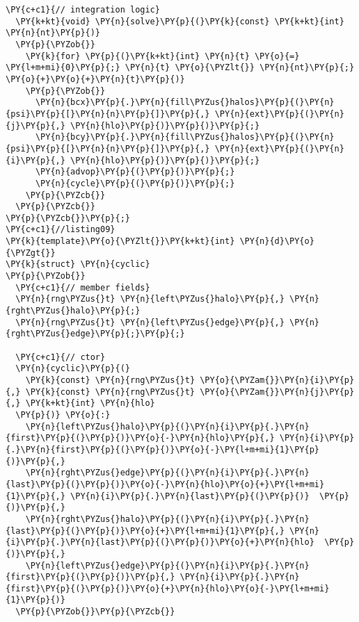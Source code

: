 \begin{Verbatim}[commandchars=\\\{\}]
  \PY{c+c1}{// integration logic}
  \PY{k+kt}{void} \PY{n}{solve}\PY{p}{(}\PY{k}{const} \PY{k+kt}{int} \PY{n}{nt}\PY{p}{)} 
  \PY{p}{\PYZob{}}
    \PY{k}{for} \PY{p}{(}\PY{k+kt}{int} \PY{n}{t} \PY{o}{=} \PY{l+m+mi}{0}\PY{p}{;} \PY{n}{t} \PY{o}{\PYZlt{}} \PY{n}{nt}\PY{p}{;} \PY{o}{+}\PY{o}{+}\PY{n}{t}\PY{p}{)} 
    \PY{p}{\PYZob{}}
      \PY{n}{bcx}\PY{p}{.}\PY{n}{fill\PYZus{}halos}\PY{p}{(}\PY{n}{psi}\PY{p}{[}\PY{n}{n}\PY{p}{]}\PY{p}{,} \PY{n}{ext}\PY{p}{(}\PY{n}{j}\PY{p}{,} \PY{n}{hlo}\PY{p}{)}\PY{p}{)}\PY{p}{;}
      \PY{n}{bcy}\PY{p}{.}\PY{n}{fill\PYZus{}halos}\PY{p}{(}\PY{n}{psi}\PY{p}{[}\PY{n}{n}\PY{p}{]}\PY{p}{,} \PY{n}{ext}\PY{p}{(}\PY{n}{i}\PY{p}{,} \PY{n}{hlo}\PY{p}{)}\PY{p}{)}\PY{p}{;}
      \PY{n}{advop}\PY{p}{(}\PY{p}{)}\PY{p}{;}
      \PY{n}{cycle}\PY{p}{(}\PY{p}{)}\PY{p}{;}
    \PY{p}{\PYZcb{}}
  \PY{p}{\PYZcb{}}
\PY{p}{\PYZcb{}}\PY{p}{;}
\PY{c+c1}{//listing09}
\PY{k}{template}\PY{o}{\PYZlt{}}\PY{k+kt}{int} \PY{n}{d}\PY{o}{\PYZgt{}}
\PY{k}{struct} \PY{n}{cyclic}
\PY{p}{\PYZob{}}
  \PY{c+c1}{// member fields}
  \PY{n}{rng\PYZus{}t} \PY{n}{left\PYZus{}halo}\PY{p}{,} \PY{n}{rght\PYZus{}halo}\PY{p}{;}
  \PY{n}{rng\PYZus{}t} \PY{n}{left\PYZus{}edge}\PY{p}{,} \PY{n}{rght\PYZus{}edge}\PY{p}{;}\PY{p}{;}

  \PY{c+c1}{// ctor}
  \PY{n}{cyclic}\PY{p}{(}
    \PY{k}{const} \PY{n}{rng\PYZus{}t} \PY{o}{\PYZam{}}\PY{n}{i}\PY{p}{,} \PY{k}{const} \PY{n}{rng\PYZus{}t} \PY{o}{\PYZam{}}\PY{n}{j}\PY{p}{,} \PY{k+kt}{int} \PY{n}{hlo}
  \PY{p}{)} \PY{o}{:}
    \PY{n}{left\PYZus{}halo}\PY{p}{(}\PY{n}{i}\PY{p}{.}\PY{n}{first}\PY{p}{(}\PY{p}{)}\PY{o}{-}\PY{n}{hlo}\PY{p}{,} \PY{n}{i}\PY{p}{.}\PY{n}{first}\PY{p}{(}\PY{p}{)}\PY{o}{-}\PY{l+m+mi}{1}\PY{p}{)}\PY{p}{,}
    \PY{n}{rght\PYZus{}edge}\PY{p}{(}\PY{n}{i}\PY{p}{.}\PY{n}{last}\PY{p}{(}\PY{p}{)}\PY{o}{-}\PY{n}{hlo}\PY{o}{+}\PY{l+m+mi}{1}\PY{p}{,} \PY{n}{i}\PY{p}{.}\PY{n}{last}\PY{p}{(}\PY{p}{)}  \PY{p}{)}\PY{p}{,}
    \PY{n}{rght\PYZus{}halo}\PY{p}{(}\PY{n}{i}\PY{p}{.}\PY{n}{last}\PY{p}{(}\PY{p}{)}\PY{o}{+}\PY{l+m+mi}{1}\PY{p}{,} \PY{n}{i}\PY{p}{.}\PY{n}{last}\PY{p}{(}\PY{p}{)}\PY{o}{+}\PY{n}{hlo}  \PY{p}{)}\PY{p}{,}
    \PY{n}{left\PYZus{}edge}\PY{p}{(}\PY{n}{i}\PY{p}{.}\PY{n}{first}\PY{p}{(}\PY{p}{)}\PY{p}{,} \PY{n}{i}\PY{p}{.}\PY{n}{first}\PY{p}{(}\PY{p}{)}\PY{o}{+}\PY{n}{hlo}\PY{o}{-}\PY{l+m+mi}{1}\PY{p}{)}
  \PY{p}{\PYZob{}}\PY{p}{\PYZcb{}} 


\end{Verbatim}
